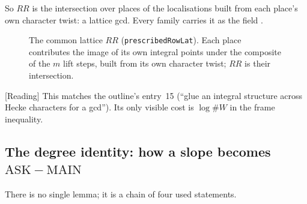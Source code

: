 \documentclass[11pt]{article}
\newcommand{\Reading}{\textcolor{readc}{\textsf{\small[Reading]}}}
\newcommand{\Oc}{\mathcal{O}}
\newcommand{\ASK}{\mathrm{ASK}}
\newcommand{\MAIN}{\mathrm{MAIN}}
\theoremstyle{plain}
\theoremstyle{definition}
\begin{document}
So $RR$ is the intersection over places of the localisations built from each place's own character
twist: a lattice gcd. Every family carries it as the field .

\begin{figure}[ht]
\centering
{}
\caption{The common lattice $RR$ (\texttt{prescribedRowLat}). Each place contributes the image of its
own integral points under the composite of the $m$ lift steps, built from its own character twist;
$RR$ is their intersection.}\label{fig:RR}
\end{figure}


\Reading{} This matches the outline's entry~15 (``glue an integral structure across Hecke characters
for a gcd''). Its only visible cost is $\log\#W$ in the frame inequality.

\subsection{The degree identity: how a slope becomes $\ASK-\MAIN$}

There is no single lemma; it is a chain of four used statements.
\end{document}
